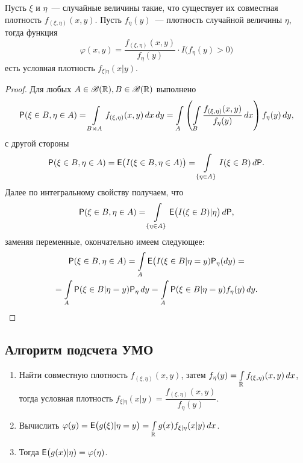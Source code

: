  \begin{theorem}
 	Пусть $\xi$ и $\eta$~--- случайные величины такие, что существует их совместная 
 	плотность $f_{(\xi, \eta)} (x, y)$. Пусть $f_\eta (y)$~--- плотность случайной 
 	величины $\eta$, тогда функция 
 	$$\varphi(x, y) = 
 	\dfrac{f_{(\xi, \eta)} (x, y)}{f_\eta (y)} \cdot I \big(f_\eta(y) > 0 \big)$$ 
 	есть условная плотность $f_{\xi |\eta} (x | y)$.
 	\begin{proof}
 		Для любых $A \in \B(\R), B \in \B(\R)$ выполнено
 		\begin{multline*}
 			\P(\xi \in B, \eta \in A) = 
 			\int\limits_{B \rtimes A} f_{(\xi, \eta)} (x, y) \, dx \, dy = 
 			\int\limits_A \left( \int\limits_B \dfrac{f_{(\xi, \eta)} 
 			(x, y)}{f_\eta(y)} \, dx \right) f_\eta(y) \, dy,
 		\end{multline*}
 		с другой стороны
 		\begin{equation*}
 			\P( \xi \in B, \eta \in A) = \E \big( I (\xi \in B, \eta \in A) \big) = 
 			\int\limits_{\{\eta \in A \}} I(\xi \in B) \, d\P.
 		\end{equation*}
 		Далее по интегральному свойству получаем, что
 		\begin{equation*}
 			\P( \xi \in B, \eta \in A) = 
 			\int\limits_{\{\eta \in A \}} \E  \big( I(\xi \in B) | \eta \big) \, d\P,
 		\end{equation*}
 		заменяя переменные, окончательно имеем следующее:
 		\begin{multline*}
 			\P( \xi \in B, \eta \in A) = 
 			\int\limits_A \E \big( I (\xi \in B | \eta = y) \P_\eta(d y) =\\ 
 			= \int\limits_A \P(\xi \in B | \eta = y) \P_\eta \, dy = 
 			\int\limits_A \P( \xi \in B | \eta = y) f_\eta (y) \, dy.
 		\end{multline*}
 	\end{proof}
 \end{theorem}
 \subsection{Алгоритм подсчета УМО}
 \begin{enumerate}
 	\item {Найти совместную плотность $f_{(\xi, \eta)} (x, y)$, затем 
 		$f_\eta (y) = \int\limits_\R f_{(\xi, \eta)} (x, y) \, dx$, тогда условная
 	 	плотность $f_{ \xi | \eta } (x | y) = \dfrac{f_{(\xi, \eta)} (x, y)}{f_\eta (y)}$.}
 	\item {Вычислить $\varphi(y) = \E \big( g(\xi) | \eta = y \big) = 
 		\int\limits_\R g(x) f_{ \xi | \eta } (x | y) \, dx $.}
 	\item {Тогда $\E  \big( g(x) | \eta) = \varphi(\eta)$.}
 \end{enumerate}
